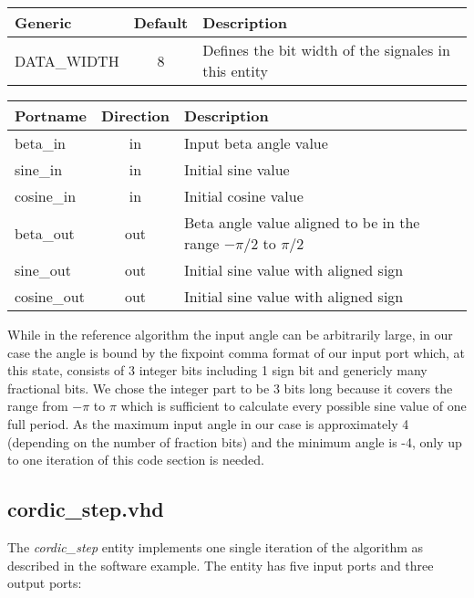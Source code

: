 \begin{center}
	\begin{tabular}{ | l | c | l | }
		\hline
		\textbf{Generic} & \textbf{Default} & \textbf{Description} \\
		\hline
		DATA\_WIDTH & 8 & Defines the bit width of the signales in this entity \\
		\hline
	\end{tabular} 
\end{center}

\begin{center}
	\begin{tabular}{ | l | c | l | }
		\hline
		\textbf{Portname} & \textbf{Direction} & \textbf{Description} \\
		\hline
		beta\_in & in & Input beta angle value \\
		sine\_in & in  & Initial sine value \\
		cosine\_in & in  & Initial cosine value \\
		beta\_out & out  & Beta angle value aligned to be in the range \(-\pi/2\) to \(\pi/2\) \\
		sine\_out & out  & Initial sine value with aligned sign \\
		cosine\_out & out  & Initial sine value with aligned sign \\
		\hline
	\end{tabular} 
\end{center}

While in the reference algorithm the input angle can be arbitrarily large, in our case the angle is bound by the fixpoint comma format of our input port which, at this state, consists of 3 integer bits including 1 sign bit and genericly many fractional bits. We chose the integer part to be 3 bits long because it covers the range from \(-\pi\) to \(\pi\) which is sufficient to calculate every possible sine value of one full period. As the maximum input angle in our case is approximately 4 (depending on the number of fraction bits) and the minimum angle is -4, only up to one iteration of this code section is needed.


\subsection{cordic\_step.vhd}

The \textit{cordic\_step} entity implements one single iteration of the algorithm as described in the software example. The entity has five input ports and three output ports:

